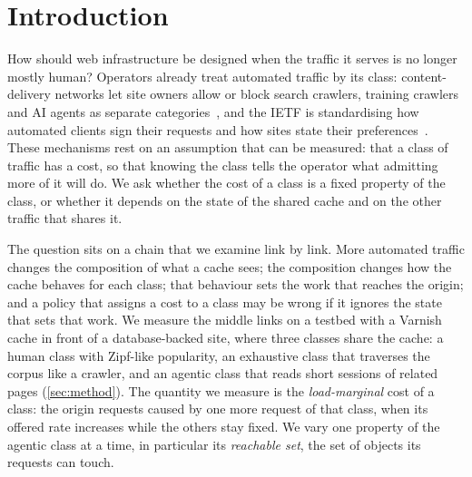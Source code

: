 \section{Introduction}\label{sec:intro}
How should web infrastructure be designed when the traffic it serves is no longer
mostly human?
Operators already treat automated traffic by its class: content-delivery networks let site
owners allow or block search crawlers, training crawlers and AI agents as separate
categories~\cite{cloudflare2026options}, and the IETF is standardising how automated
clients sign their requests and how sites state their
preferences~\cite{ietf-webbotauth,ietf-aipref-vocab}.
These mechanisms rest on an assumption that can be measured: that a class of traffic has a
cost, so that knowing the class tells the operator what admitting more of it will do.
We ask whether the cost of a class is a fixed property of the class, or whether it depends
on the state of the shared cache and on the other traffic that shares it.

The question sits on a chain that we examine link by link.
More automated traffic changes the composition of what a cache sees; the composition
changes how the cache behaves for each class; that behaviour sets the work that reaches the
origin; and a policy that assigns a cost to a class may be wrong if it ignores the state
that sets that work.
We measure the middle links on a testbed with a Varnish cache in front of a
database-backed site, where three classes share the cache: a human class with Zipf-like
popularity, an exhaustive class that traverses the corpus like a crawler, and an agentic
class that reads short sessions of related pages (\cref{sec:method}).
The quantity we measure is the \emph{load-marginal} cost of a class: the origin requests
caused by one more request of that class, when its offered rate increases while the others
stay fixed.
We vary one property of the agentic class at a time, in particular its \emph{reachable
set}, the set of objects its requests can touch.

